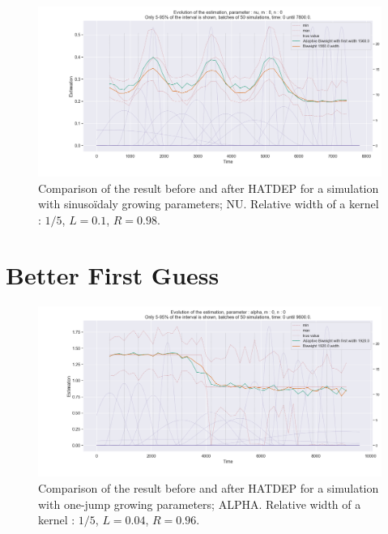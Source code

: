 \begin{figure}
\centering
\includegraphics[width = 0.90 \textwidth]{../imag/chap3/4/O.png}
\caption{Comparison of the result before and after HATDEP for a simulation with sinusoïdaly growing parameters; NU. Relative width of a kernel : $1/5$, $L = 0.1$, $R = 0.98$.}
\label{fig:first_estimate_4_nu}
\end{figure}



































\newpage
\section{Better First Guess}



\begin{figure}
\centering
\includegraphics[width = 0.90 \textwidth]{../imag/chap3/2_bis/P.png}
\caption{Comparison of the result before and after HATDEP for a simulation with one-jump growing parameters; ALPHA. Relative width of a kernel : $1/5$, $L = 0.04$, $R = 0.96$.}
\label{fig:second_estimate_2_alpha}
\end{figure}

